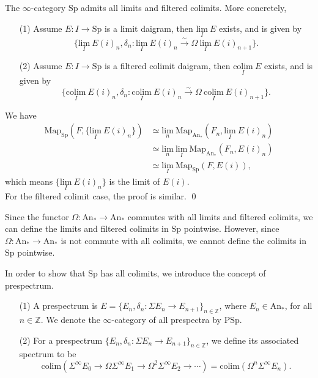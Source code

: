 \documentclass[UTF8,12,a4paper]{ctexart}
\theoremstyle{definition}
\newcommand{\An}{\text{An}}
\newcommand{\Sp}{\text{Sp}}
\begin{document}
\prop
The $\infty$-category $\Sp$ admits all limits and  filtered colimits. More concretely, 
\begin{itemize}
	\item [(1)]
	Assume $E:I\rightarrow \Sp$ is a limit daigram, then $\underset{I}{\text{lim}}\ E$ exists, and is given by
		$$
		\{\underset{I}{\text{lim}}\ E(i)_n, \delta_n:
	\underset{I}{\text{lim}}\ E(i)_n\stackrel{\sim}{\rightarrow}
		\Omega\  \underset{I}{\text{lim}}\ E(i)_{n+1}\}.
		$$
		\item [(2)]
		Assume $E:I\rightarrow \Sp$ is a filtered colimit daigram, then $\underset{I}{\text{colim}}\ E$ exists, and is given by
		$$
		\{\underset{I}{\text{colim}}\ E(i)_n, \delta_n:
		\underset{I}{\text{colim}}\ E(i)_n\stackrel{\sim}{\rightarrow}
		\Omega\  \underset{I}{\text{colim}}\ E(i)_{n+1}\}.
		$$
\end{itemize}
\pf 
We have 
\begin{align*}
\text{Map}_\Sp(F, \{\underset{I}{\text{lim}}\ E(i)_n\})
&\simeq \underset{n}{\text{lim}}\ 
\text{Map}_{\An_*}(F_n, \underset{I}{\text{lim}}\ E(i)_n)\\
&\simeq \underset{n}{\text{lim}}\  \underset{I}{\text{lim}}\ 
\text{Map}_{\An_*}(F_n,E(i)_n)\\
&\simeq  \underset{I}{\text{lim}}\ 
\text{Map}_{\Sp}(F,E(i)),
\end{align*} 
 which means $\{\underset{I}{\text{lim}}\ E(i)_n\}$ is the limit of $E(i).$ \\
For the filtered colimit case, the proof is similar.
\qed
 




Since the functor $\Omega:\An_*\rightarrow \An_*$ commutes with all limits and filtered colimits, we can define the limits and filtered colimits in $\Sp$ pointwise. However, since $\Omega:\An_*\rightarrow \An_*$ is not commute with all colimits, we cannot define the colimits in $\Sp$ pointwise.

In order to show that $\Sp$ has all colimits, we introduce the concept of prespectrum.
\dfn 
\begin{itemize}
	\item [(1)]A prespectrum is 
	$E=\{E_n,\delta_n: \Sigma E_n \rightarrow  E_{n+1} \}_{n\in\mathbb{Z}}$, where $E_n\in \An_*$, for all $n\in\mathbb{Z}$. We denote the $\infty$-category of all prespectra by $\text{PSp}$.
	\item [(2)] For a prespectrum $\{E_n,\delta_n:\Sigma E_n \rightarrow  E_{n+1} \}_{n\in\mathbb{Z}}$, we define its associated spectrum to be
	$$
	\text{colim}
	(\Sigma^\infty E_0\rightarrow \Omega \Sigma^\infty E_1\rightarrow
	 \Omega^2 \Sigma^\infty E_2\rightarrow \cdots)
	 =\text{colim}(\Omega^n \Sigma^\infty E_n).
	$$
\end{itemize}
\end{document}
